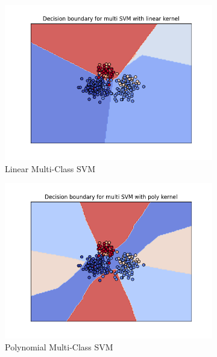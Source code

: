 \documentclass[12pt]{article}
\begin{document}
\begin{figure}
    \centering
    \begin{subfigure}{0.45\textwidth}
        \centering
        \includegraphics[width=\textwidth]{plots/linear_multi.png}
        \caption{Linear Multi-Class SVM}
    \end{subfigure}
    \begin{subfigure}{0.45\textwidth}
        \centering
        \includegraphics[width=\textwidth]{plots/poly_multi.png}
        \caption{Polynomial Multi-Class SVM}
    \end{subfigure}
    \begin{subfigure}{0.45\textwidth}
        \centering

\end{subfigure}
\end{figure}
\end{document}
